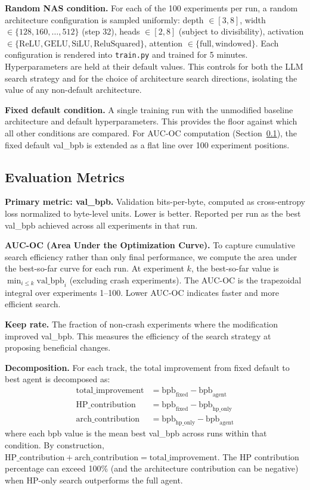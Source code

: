 \textbf{Random NAS condition.}
For each of the 100 experiments per run, a random architecture configuration is sampled uniformly: depth $\in [3, 8]$, width $\in \{128, 160, \ldots, 512\}$ (step 32), heads $\in [2, 8]$ (subject to divisibility), activation $\in \{\text{ReLU}, \text{GELU}, \text{SiLU}, \text{ReluSquared}\}$, attention $\in \{\text{full}, \text{windowed}\}$. Each configuration is rendered into \texttt{train.py} and trained for 5 minutes. Hyperparameters are held at their default values. This controls for both the LLM search strategy and for the choice of architecture search directions, isolating the value of any non-default architecture.

\textbf{Fixed default condition.}
A single training run with the unmodified baseline architecture and default hyperparameters. This provides the floor against which all other conditions are compared. For AUC-OC computation (Section~\ref{sec:evaluation_metrics}), the fixed default val\_bpb is extended as a flat line over 100 experiment positions.

\subsection{Evaluation Metrics}
\label{sec:evaluation_metrics}

\textbf{Primary metric: val\_bpb.}
Validation bits-per-byte, computed as cross-entropy loss normalized to byte-level units. Lower is better. Reported per run as the best val\_bpb achieved across all experiments in that run.

\textbf{AUC-OC (Area Under the Optimization Curve).}
To capture cumulative search efficiency rather than only final performance, we compute the area under the best-so-far curve for each run. At experiment $k$, the best-so-far value is $\min_{i \leq k} \text{val\_bpb}_i$ (excluding crash experiments). The AUC-OC is the trapezoidal integral over experiments 1--100. Lower AUC-OC indicates faster and more efficient search.

\textbf{Keep rate.}
The fraction of non-crash experiments where the modification improved val\_bpb. This measures the efficiency of the search strategy at proposing beneficial changes.

\textbf{Decomposition.}
For each track, the total improvement from fixed default to best agent is decomposed as:
\begin{align}
\text{total\_improvement} &= \text{bpb}_\text{fixed} - \text{bpb}_\text{agent} \label{eq:total} \\
\text{HP\_contribution} &= \text{bpb}_\text{fixed} - \text{bpb}_\text{hp\_only} \label{eq:hp} \\
\text{arch\_contribution} &= \text{bpb}_\text{hp\_only} - \text{bpb}_\text{agent} \label{eq:arch}
\end{align}
where each bpb value is the mean best val\_bpb across runs within that condition. By construction, $\text{HP\_contribution} + \text{arch\_contribution} = \text{total\_improvement}$. The HP contribution percentage can exceed 100\% (and the architecture contribution can be negative) when HP-only search outperforms the full agent.

